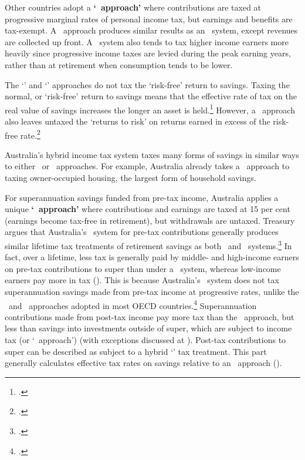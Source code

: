 \begin{subappendices}
Other countries adopt a \textbf{‘\TEE\ approach’} where contributions are taxed at progressive marginal rates of personal income tax, but earnings and benefits are tax-exempt. A \TEE\ approach produces similar results as an \EET\ system, except revenues are collected up front. A \TEE\ system also tends to tax higher income earners more heavily since progressive income taxes are levied during the peak earning years, rather than at retirement when consumption tends to be lower. 

The ‘\EET’ and ‘\TEE’ approaches do not tax the ‘risk-free’ return to savings. Taxing the normal, or ‘risk-free’ return to savings means that the effective rate of tax on the real value of savings increases the longer an asset is held.\footcite[][297]{MirrleesAdamBesleyEtAl2011}  However, a \TEE\ approach also leaves untaxed the ‘returns to risk’ on returns earned in excess of the risk-free rate.\footcite[][16]{Ingles2015}

Australia’s hybrid income tax system taxes many forms of savings in similar ways to either \EET\ or \TEE\ approaches. For example, Australia already takes a \TEE\ approach to taxing owner-occupied housing, the largest form of household savings.

For superannuation savings funded from pre-tax income, Australia applies a unique \textbf{‘\ttE\ approach’} where contributions and earnings are taxed at 15 per cent (earnings become tax-free in retirement), but withdrawals are untaxed. Treasury argues that Australia’s \ttE\ system for pre-tax contributions generally produces similar lifetime tax treatments of retirement savings as both \EET\ and \TEE\ systems.\footcite[][97]{HenryTaxReview2010}  In fact, over a lifetime, less tax is generally paid by middle- and high-income earners on pre-tax contributions to super than under a \TEE\ system, whereas low-income earners pay more in tax (). This is because Australia’s \ttE\ system does not tax superannuation savings made from pre-tax income at progressive rates, unlike the \TEE\ and \EET\ approaches adopted in most OECD countries.\footcite[][7]{Mercer2013a} 
Superannuation contributions made from post-tax income pay more tax than the \TEE\ approach, but less than savings into investments outside of super, which are subject to income tax (or ‘\TTE\ approach’) (with exceptions discussed at ). Post-tax contributions to super can be described as subject to a hybrid ‘\TtE’ tax treatment. This part generally calculates effective tax rates on savings relative to an \EET\ approach ().


\end{subappendices}
